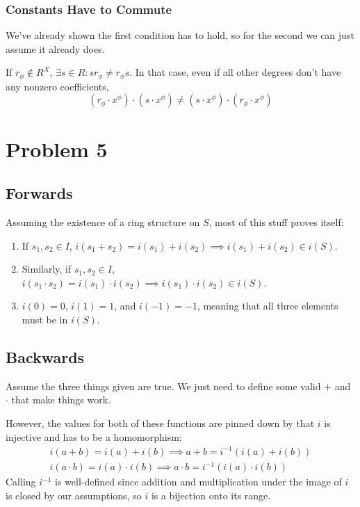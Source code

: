 \documentclass[12pt]{article}
\begin{document}
\subsubsection{Constants Have to Commute}

We've already shown the first condition has to hold, so for the second
we can just assume it already does.

If $r_\phi \notin R^X$, $\exists s \in R: sr_\phi \ne r_\phi s$.
In that case, even if all other degrees don't have any nonzero coefficients,
\[\left(r_\phi \cdot x^\phi\right) \cdot \left(s \cdot x^\phi\right)
  \ne \left(s \cdot x^\phi\right) \cdot \left(r_\phi \cdot x^\phi\right)\]

\pagebreak

\section{Problem 5}

\subsection{Forwards}

Assuming the existence of a ring structure on $S$,
most of this stuff proves itself:
\begin{enumerate}
  \item If $s_1, s_2 \in I$, $i(s_1+s_2)=i(s_1)+i(s_2) \implies i(s_1)+i(s_2) \in i(S)$.
  \item Similarly, if $s_1, s_2 \in I$, $i(s_1 \cdot s_2)=i(s_1) \cdot i(s_2) \implies i(s_1) \cdot i(s_2) \in i(S)$.
  \item $i(0)=0$, $i(1)=1$, and $i(-1)=-1$, meaning that all three elements must be in $i(S)$.
\end{enumerate}

\subsection{Backwards}

Assume the three things given are true.
We just need to define some valid $+$ and $\cdot$ that make things work.

However, the values for both of these functions are pinned down by
that $i$ is injective and has to be a homomorphism:
\begin{gather*}
  i(a+b)=i(a)+i(b) \implies a+b = i^{-1}(i(a)+i(b)) \\
  i(a \cdot b) = i(a) \cdot i(b) \implies a \cdot b = i^{-1}(i(a) \cdot i(b))
\end{gather*}
Calling $i^{-1}$ is well-defined since addition and multiplication under the image
of $i$ is closed by our assumptions, so $i$ is a bijection onto its range.
\end{document}
